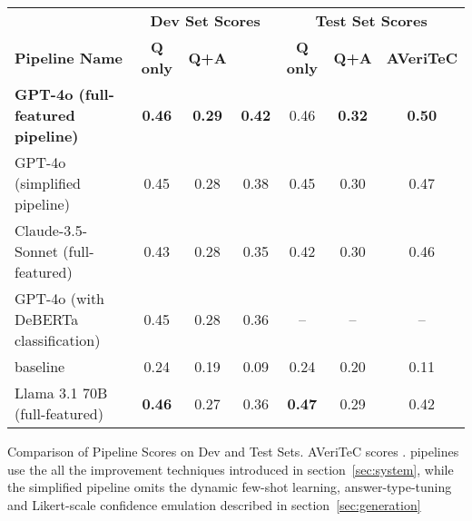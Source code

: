     \centering
    \begin{tabular}{l | c c c | c c c}
    \hline
    &\multicolumn{3}{c|}{\textbf{Dev Set Scores}} & \multicolumn{3}{c}{\textbf{Test Set Scores}}  \\
    \textbf{Pipeline Name} & \textbf{Q only} & \textbf{Q+A} & \textbf{\averitec{}} & \textbf{Q only} & \textbf{Q+A} & \textbf{AVeriTeC} \\ \hline
    \textbf{GPT-4o (full-featured pipeline)}      & \textbf{0.46} & \textbf{0.29} & \textbf{0.42} & 0.46 & \textbf{0.32} & \textbf{0.50}\\
    GPT-4o (simplified pipeline)         & 0.45 & 0.28 & 0.38 & 0.45 & 0.30 & 0.47 \\
    Claude-3.5-Sonnet (full-featured)             & 0.43 & 0.28 & 0.35 & 0.42 & 0.30 & 0.46 \\
    GPT-4o (with DeBERTa classification)              & 0.45 & 0.28 & 0.36 & -- & -- & --\\
    \averitec{} baseline            & 0.24 & 0.19 & 0.09 & 0.24 & 0.20 & 0.11\\
    \hline
    Llama 3.1 70B (full-featured) & \textbf{0.46} & 0.27 & 0.36 & \textbf{0.47} & 0.29 & 0.42\\
    \bottomrule
    \end{tabular}
    \caption{Comparison of Pipeline Scores on Dev and Test Sets.  AVeriTeC scores .  pipelines use the all the improvement techniques introduced in section~\ref{sec:system}, while the simplified pipeline omits the dynamic few-shot learning, answer-type-tuning and Likert-scale confidence emulation described in section~\ref{sec:generation}}
    \label{tab:pipeline_scores}